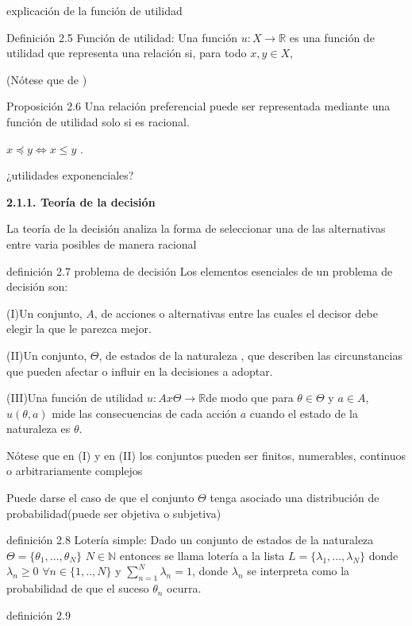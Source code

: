 \documentclass[11pt, a4paper]{article} %
\newcommand{\R}{\ensuremath{\mathbb{R}}}
\begin{document}
explicación de la función de utilidad

Definición 2.5 Función de utilidad: Una función $u:X \to \R$ es una función de utilidad que representa una relación si, para todo $x,y \in X$,

(Nótese que de  )


Proposición 2.6 
Una relación preferencial puede ser representada mediante una función de utilidad solo si es racional.

$x \preceq y \iff x \le y$ .

¿utilidades exponenciales?


{\bfseries \large 2.1.1. Teoría de la decisión} \vspace{5mm}

La teoría de la decisión analiza la forma de seleccionar una de las alternativas entre varia posibles de manera racional

definición 2.7 problema de decisión  
 Los elementos esenciales de un problema de decisión son:
  
  (I)Un conjunto, $A$, de acciones o alternativas entre las cuales el decisor debe elegir la que le parezca mejor.
  
  (II)Un conjunto, $\Theta$, de estados de la naturaleza , que describen las circunstancias que pueden afectar o influir en la decisiones a adoptar.
  
  (III)Una función de utilidad $u:Ax\Theta \to \R$de modo que  para $\theta \in \Theta $ y $a \in A$, $u(\theta , a)$ mide las consecuencias de cada acción $a$ cuando el estado de la naturaleza es $\theta$.
   
   
Nótese que en (I) y en (II) los conjuntos pueden ser finitos, numerables, continuos o arbitrariamente complejos

Puede darse el caso de que el conjunto $\Theta$ tenga asociado una distribución de probabilidad(puede ser objetiva o subjetiva)

definición 2.8 Lotería simple: Dado un conjunto de estados de la naturaleza $\Theta =\{ \theta_1,...,\theta_N \} $ $N \in \mathbb{N}$ entonces se llama lotería a la lista $L=\{ \lambda_1,...,\lambda_N\} $ donde $\lambda_n \ge 0$ $\forall n \in \{ 1,..,N\} $ y $\sum_{n=1}^{N} \lambda_n=1$, donde $\lambda_n$ se interpreta como la probabilidad de que el suceso $\theta_n$ ocurra.


definición 2.9 


\newpage

\end{document}
